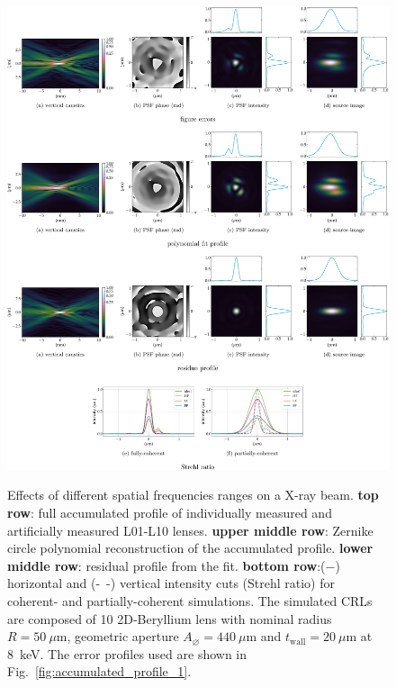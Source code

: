 \begin{refsection}
\begin{figure}[t]
        \centering
        {\includegraphics[width=1\linewidth]{figures/ch05/CDnFF_LF_HH.pdf}}
        \caption[Effects of different spatial frequencies ranges on a X-ray beam]{Effects of different spatial frequencies ranges on a X-ray beam. \textbf{top row}: full accumulated profile of individually measured and artificially measured L01-L10 lenses. \textbf{upper middle row}: Zernike circle polynomial reconstruction of the accumulated profile. \textbf{lower middle row}: residual profile from the fit. \textbf{bottom row}:($-$) horizontal and (-~-) vertical intensity cuts (Strehl ratio) for coherent- and partially-coherent simulations. The simulated CRLs are composed of 10 2D-Beryllium lens with nominal radius $R=50~\mu\text{m}$, geometric aperture $A_{\diameter}=440~\mu\text{m}$ and $t_\text{wall}=20~\mu$m at 8~keV. The error profiles used are shown in Fig.~\ref{fig:accumulated_profile_1}.}\label{fig:CDnFF_LF_HH}
\end{figure}


\end{refsection}

